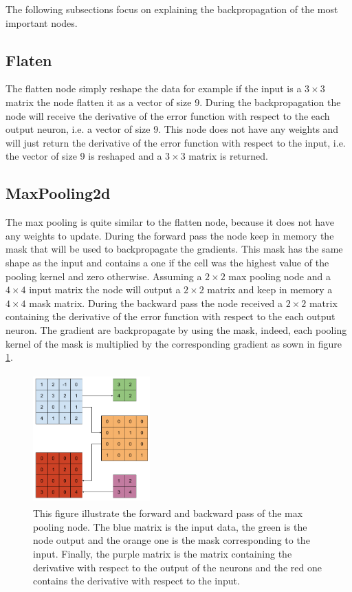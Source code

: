 \documentclass[11pt]{report}
\begin{document}
\noindent The following subsections focus on explaining the backpropagation of the most important nodes.

\subsection{Flaten}

The flatten node simply reshape the data for example if the input is a $3\times3$ matrix the node flatten it as a vector of size 9. During the backpropagation the node will receive the derivative of the error function with respect to the each output neuron, i.e. a vector of size 9. This node does not have any weights and will just return the derivative of the error function with respect to the input, i.e. the vector of size 9 is reshaped and a $3\times3$ matrix is returned.

\subsection{MaxPooling2d}

The max pooling is quite similar to the flatten node, because it does not have any weights to update. During the forward pass the node keep in memory the mask that will be used to backpropagate the gradients. This mask has the same shape as the input and contains a one if the cell was the highest value of the pooling kernel and zero otherwise. Assuming a $2\times2$ max pooling node and a $4\times4$ input matrix the node will output a $2\times2$ matrix and keep in memory a $4\times4$ mask matrix. During the backward pass the node received a $2\times2$ matrix containing the derivative of the error function with respect to the each output neuron. The gradient are backpropagate by using the mask, indeed, each pooling kernel of the mask is multiplied by the corresponding gradient as sown in figure \ref{fig:max_pooling_bp}.

\begin{figure}[h]
\centering
\includegraphics[width=4.5cm, height=5cm]{max_pooling_bp}
\caption[Backropagation in max pooling layer]{This figure illustrate the forward and backward pass of the max pooling node. The blue matrix is the input data, the green is the node output and the orange one is the mask corresponding to the input. Finally, the purple matrix is the matrix containing the derivative with respect to the output of the neurons and the red one contains the derivative with respect to the input.}
\label{fig:max_pooling_bp}
\end{figure}
\end{document}
